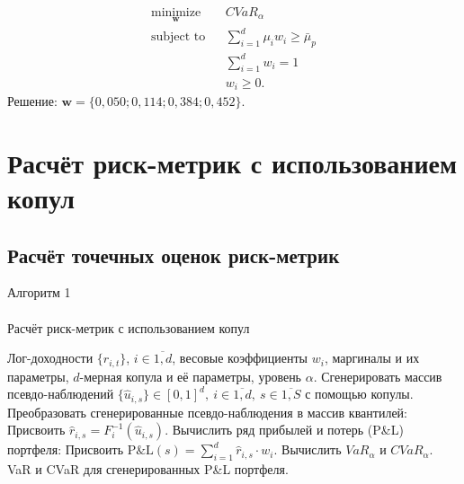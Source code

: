 \documentclass[aspectratio=169]{beamer}
\begin{document}
\begin{frame}{\insertsection}
    \framesubtitle{\insertsubsection}
    \begin{eqnarray}
        \underset{\textbf{w}}{\text{minimize}} & & \textit{CVaR}_\alpha \\
        \text{subject to} & & \sum_{i=1}^d \mu_i w_i \ge \bar{\mu}_p \nonumber \\
        & & \sum_{i=1}^d w_i = 1 \nonumber \\
        & & w_i \ge 0. \nonumber
    \end{eqnarray}
Решение: $\textbf{w}=\{0,050; 0,114; 0,384; 0,452\}$.
\end{frame}

\section{Расчёт риск-метрик с использованием копул}
\subsection{Расчёт точечных оценок риск-метрик}

\begin{frame}{Алгоритм 1}
    \framesubtitle{\insertsubsection}
    \begin{algorithm}[H]
    \scriptsize
  \caption{Расчёт риск-метрик с использованием копул}
    \label{Alg1}
    \begin{algorithmic}[1]
    	\Require Лог-доходности $\{r_{i,t}\}$, $i \in \overline{1,d}$, весовые коэффициенты $w_i$, маргиналы и их параметры, $d$-мерная копула и её параметры, уровень $\alpha$.
    	\State Сгенерировать массив псевдо-наблюдений 
    	$\{\hat{u}_{i,s}\} \in [0, 1]^d, \ i \in \overline{1,d}, \ s \in \overline{1, S}$ 
    	с помощью копулы.
    	\State Преобразовать сгенерированные псевдо-наблюдения в массив квантилей:
    	        \State Присвоить $\hat{r}_{i,s} = F^{-1}_i (\hat{u}_{i,s})$.
    	    \EndFor
    	\EndFor
    	\State Вычислить ряд прибылей и потерь (P\&L) портфеля:
    	\State Присвоить $\text{P\&L}(s) = \sum_{i=1}^d \hat{r}_{i,s} \cdot w_i$.
    	\EndFor
    	\State Вычислить $\textit{VaR}_\alpha$ и $\textit{CVaR}_\alpha$.
    	\Ensure VaR и CVaR для сгенерированных P\&L портфеля.
    \end{algorithmic}
    \end{algorithm}
\end{frame}
\end{document}

